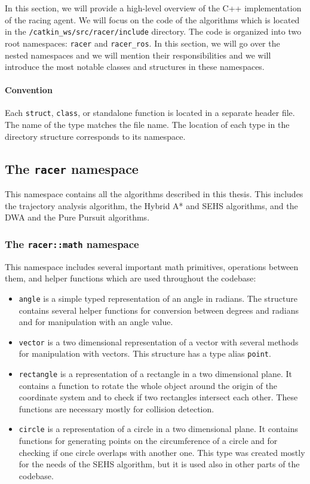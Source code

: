 In this section, we will provide a high-level overview of the C++ implementation of the racing agent. We will focus on the code of the algorithms which is located in the \texttt{/catkin\_ws/src/racer/include} directory. The code is organized into two root namespaces: \texttt{racer} and \texttt{racer\_ros}. In this section, we will go over the nested namespaces and we will mention their responsibilities and we will introduce the most notable classes and structures in these namespaces.

\paragraph{Convention} Each \texttt{struct}, \texttt{class}, or standalone function is located in a separate header file. The name of the type matches the file name. The location of each type in the directory structure corresponds to its namespace.

\subsection{The \texttt{racer} namespace}

This namespace contains all the algorithms described in this thesis. This includes the trajectory analysis algorithm, the Hybrid A* and \gls*{SEHS} algorithms, and the \gls*{DWA} and the Pure Pursuit algorithms.

\subsubsection{The \texttt{racer::math} namespace}

This namespace includes several important math primitives, operations between them, and helper functions which are used throughout the codebase:

\begin{itemize}
	\item \texttt{angle} is a simple typed representation of an angle in radians. The structure contains several helper functions for conversion between degrees and radians and for manipulation with an angle value.

	\item \texttt{vector} is a two dimensional representation of a vector with several methods for manipulation with vectors. This structure has a type alias \texttt{point}.

	\item \texttt{rectangle} is a representation of a rectangle in a two dimensional plane. It contains a function to rotate the whole object around the origin of the coordinate system and to check if two rectangles intersect each other. These functions are necessary mostly for collision detection.

	\item \texttt{circle} is a representation of a circle in a two dimensional plane. It contains functions for generating points on the circumference of a circle and for checking if one circle overlaps with another one. This type was created mostly for the needs of the \gls{SEHS} algorithm, but it is used also in other parts of the codebase.
\end{itemize}

